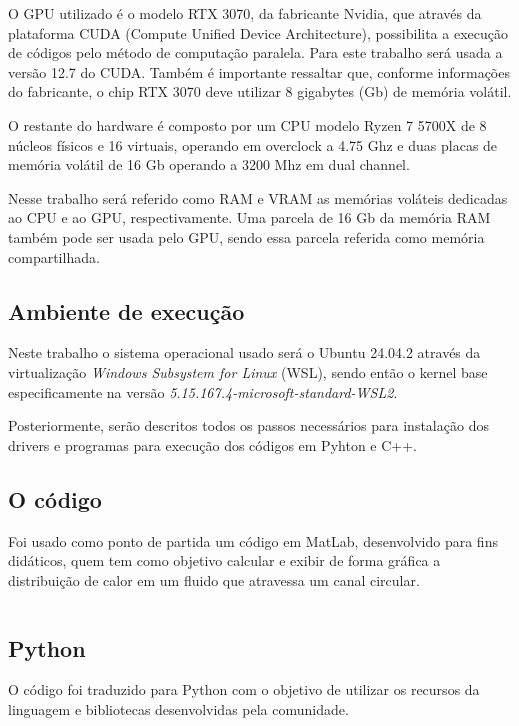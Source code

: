 \documentclass[12pt,a4paper]{article}
\begin{document}
O GPU utilizado é o modelo RTX 3070, da fabricante Nvidia, que através da plataforma CUDA (Compute Unified Device Architecture), possibilita a execução de códigos pelo método de computação paralela. Para este trabalho será usada a versão 12.7 do CUDA. Também é importante ressaltar que, conforme informações do fabricante, o chip RTX 3070 deve utilizar 8 gigabytes (Gb) de memória volátil.

O restante do hardware é composto por um CPU modelo Ryzen 7 5700X de 8 núcleos físicos e 16 virtuais, operando em overclock a 4.75 Ghz e duas placas de memória volátil de 16 Gb operando a 3200 Mhz em dual channel.

Nesse trabalho será referido como RAM e VRAM as memórias voláteis dedicadas ao CPU e ao GPU, respectivamente. Uma parcela de 16 Gb da memória RAM também pode ser usada pelo GPU, sendo essa parcela referida como memória compartilhada.

\subsection{Ambiente de execução}

Neste trabalho o sistema operacional usado será o Ubuntu 24.04.2 através da virtualização \emph{Windows Subsystem for Linux} (WSL), sendo então o kernel base especificamente na versão \emph{5.15.167.4-microsoft-standard-WSL2}.

Posteriormente, serão descritos todos os passos necessários para instalação dos drivers e programas para execução dos códigos em Pyhton e C++.

\subsection{O código}

Foi usado como ponto de partida um código em MatLab, desenvolvido para fins didáticos, quem tem como objetivo calcular e exibir de forma gráfica a distribuição de calor em um fluido que atravessa um canal circular.

\inputminted{octave}{cfd_on_gpu/aula15_exercicio_VolumesFinitos_Poiseuille_Flow_2D.m}

\subsection{Python}

O código foi traduzido para Python com o objetivo de utilizar os recursos da linguagem e bibliotecas desenvolvidas pela comunidade.
\end{document}
